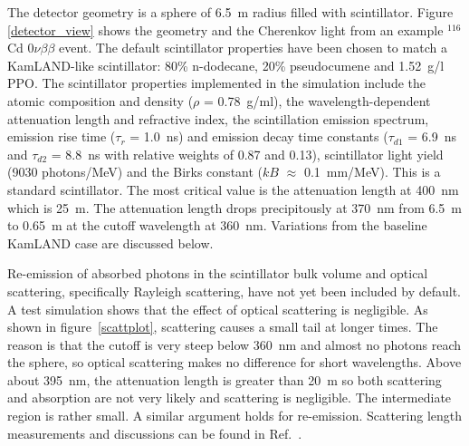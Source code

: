 \documentclass[cits]{JINST}
\begin{document}
The detector geometry is a sphere of 6.5~m radius filled with
scintillator. Figure \ref{detector_view} shows the geometry and the
Cherenkov light from an example $^{116}$Cd $0\nu\beta\beta$ event. The
default scintillator properties have been chosen to match a KamLAND-like
scintillator\cite{kamland2003}: 80\% n-dodecane, 20\% pseudocumene and 1.52~g/l PPO. The
scintillator properties implemented in the simulation include the
atomic composition and density ($\rho$ = 0.78~g/ml), the
wavelength-dependent attenuation length\cite{tajimaMaster} and
refractive index\cite{OlegThesis}, the scintillation emission
spectrum\cite{tajimaMaster}, emission rise time ($\tau_r$ = 1.0~ns)
and emission decay time constants ($\tau_{d1}$ = 6.9~ns and
$\tau_{d2}$ = 8.8~ns with relative weights of 0.87 and 
0.13)\cite{tajimaThesis}, scintillator light yield (9030 photons/MeV)
and the Birks constant ($kB$ $\approx$ 0.1~mm/MeV)\cite{ChrisThesis}.  This is a standard scintillator. The most critical value is the attenuation length at 400~nm which is 25~m. The attenuation length drops precipitously at 370~nm from 6.5~m to 0.65~m at the cutoff wavelength at 360~nm.
Variations from the baseline KamLAND case are discussed below. 

Re-emission of absorbed photons in the scintillator
bulk volume and optical scattering, specifically Rayleigh scattering, have not yet been included by default. A test simulation shows that the effect of optical scattering is negligible. As shown in figure~\ref{scattplot}, scattering causes a small tail at longer times. The reason is that the cutoff is very steep below 360~nm and almost no photons reach the sphere, so optical scattering makes no difference for short wavelengths. Above about 395~nm, the attenuation length is greater than 20~m so both scattering and absorption are not very likely and scattering is negligible. The intermediate region is rather small. A similar argument holds for re-emission. Scattering length measurements and discussions can be found in Ref.~\cite{Wurm:2010ad}. 
\end{document}
